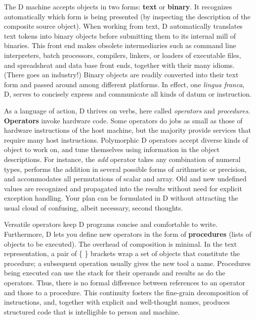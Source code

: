 The  D  machine  accepts  objects in  two  forms:  \textbf{text} or  \textbf{binary}.  It recognizes automatically which form is being presented (by inspecting the description of the composite source object).  When working from  text,  D automatically   translates  text  tokens  into  binary   objects  before submitting  them to its internal mill of binaries.  This front end  makes obsolete  intermediaries  such  as  command  line   interpreters,   batch processors,  compilers, linkers, or loaders of executable files, and spreadsheat and data base front ends, together with their many idioms. (There goes an industry!)  Binary objects are readily converted into their text form and passed around among different platforms. In effect, one \emph{lingua franca}, D, serves to concisely express and communicate all kinds of datum or instruction.

As a language of action,  D thrives on verbs,  here called \emph{operators} and \emph{procedures}. \textbf{Operators} invoke hardware code.  Some  operators  do jobs as small as  those  of  hardware instructions of the host machine,  but the majority provide services that require  many host instructions.  Polymorphic D operators accept  diverse kinds of object to work on,  and tune themselves using information in the object  descriptions.   For  instance,   the  \emph{add}  operator  takes  any combination of numeral types,  performs the addition in several  possible forms of arithmetic or precision,  and accommodates all permutations of scalar and array.  Old and new  undefined  values  are recognized  and  propagated into the results without  need  for  explicit exception handling.  Your plan can be formulated in D without  attracting the usual cloud of confusing, albeit necessary, second thoughts.

Versatile  operators keep D programs concise and comfortable  to  write. Furthermore,  D  lets you define new operators in the form of  \textbf{procedures} (lists  of  objects  to be executed).  The  overhead  of  composition  is minimal.  In the text representation, a pair of \{ \} brackets wrap a set of objects  that constitute the procedure;  a subsequent  operation  usually gives the new tool a name.  Procedures being executed can use the  stack for  their operands and results as do the operators.  Thus,  there is  no formal  difference  between  references to an operator  and  those  to  a procedure.   This  continuity  fosters  the  fine-grain  decomposition  of instructions,  and,  together with explicit and well-thought names,  produces structured code that is intelligible to person and machine.

